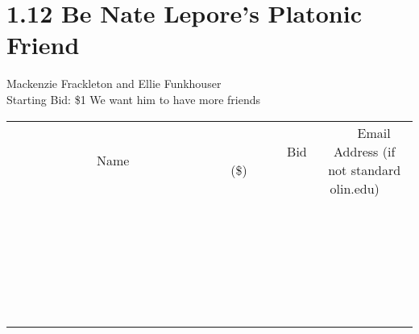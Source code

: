 \documentclass[11pt]{article}
\begin{document}
\section*{1.12 Be Nate Lepore's Platonic Friend}
Mackenzie Frackleton and Ellie Funkhouser 
\\
Starting Bid: \$1
\newline
We want him to have more friends
\\[6ex]
\begin{tabular}{c c c}
~~~~~~~~~~~~~Name~~~~~~~~~~~~~ & ~~~~~~~~~Bid (\$)~~~~~~~~~  & ~~~Email Address (if not standard olin.edu)~~~\\
 & & \\
\hline
 & & \\
\hline
 & & \\
\hline
 & & \\
\hline
 & & \\
\hline
 & & \\
\hline
 & & \\
\hline
 & & \\
\hline
 & & \\
\hline
 & & \\
\hline
 & & \\
\hline
 & & \\
\hline
 & & \\
\hline
 & & \\
\hline
 & & \\
\hline
 & & \\
\hline
 & & \\
\hline
 & & \\
\hline
 & & \\
\hline
 & & \\
\hline
 & & \\
\hline
 & & \\
\hline
 & & \\
\hline
 & & \\
\hline
 & & \\
\hline
 & & \\
\hline
\end{tabular}
\newpage
\end{document}
